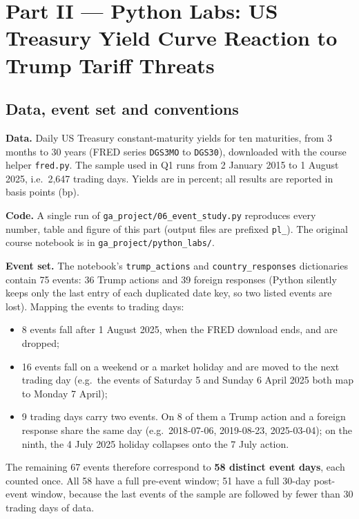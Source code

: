 \documentclass[11pt]{article}
\begin{document}
\newpage
\section{Part II --- Python Labs: US Treasury Yield Curve Reaction to Trump Tariff Threats}

\subsection*{Data, event set and conventions}

\textbf{Data.} Daily US Treasury constant-maturity yields for ten maturities,
from 3 months to 30 years (FRED series \texttt{DGS3MO} to \texttt{DGS30}),
downloaded with the course helper \texttt{fred.py}. The sample used in Q1 runs from 2 January 2015 to 1 August 2025, i.e.\
2{,}647 trading days. Yields are in percent; all results are reported in basis
points (bp).

\textbf{Code.} A single run of \nolinkurl{ga_project/06_event_study.py}
reproduces every number, table and figure of this part (output files are
prefixed \texttt{pl\_}). The original course notebook is in
\nolinkurl{ga_project/python_labs/}.

\textbf{Event set.} The notebook's \texttt{trump\_actions} and
\texttt{country\_responses} dictionaries contain 75 events: 36 Trump actions
and 39 foreign responses (Python silently keeps only the last entry of each
duplicated date key, so two listed events are lost). Mapping the events to
trading days:
\begin{itemize}[leftmargin=1.2em,nosep]
\item 8 events fall after 1 August 2025, when the FRED download ends, and are
dropped;
\item 16 events fall on a weekend or a market holiday and are moved to the
next trading day (e.g.\ the events of Saturday 5 and Sunday 6 April 2025 both
map to Monday 7 April);
\item 9 trading days carry two events. On 8 of them a Trump action and a
foreign response share the same day (e.g.\ 2018-07-06, 2019-08-23,
2025-03-04); on the ninth, the 4 July 2025 holiday collapses onto the
7 July action.
\end{itemize}
The remaining 67 events therefore correspond to \textbf{58 distinct event
days}, each counted once. All 58 have a full pre-event window; 51 have a full
30-day post-event window, because the last events of the sample are followed
by fewer than 30 trading days of data.
\end{document}
